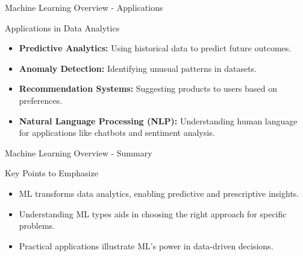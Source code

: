 \documentclass[aspectratio=169]{beamer}
\begin{document}
\begin{frame}[fragile]{Machine Learning Overview - Applications}
    \begin{block}{Applications in Data Analytics}
        \begin{itemize}
            \item \textbf{Predictive Analytics:} Using historical data to predict future outcomes.
            \item \textbf{Anomaly Detection:} Identifying unusual patterns in datasets.
            \item \textbf{Recommendation Systems:} Suggesting products to users based on preferences.
            \item \textbf{Natural Language Processing (NLP):} Understanding human language for applications like chatbots and sentiment analysis.
        \end{itemize}
    \end{block}
\end{frame}

\begin{frame}[fragile]{Machine Learning Overview - Summary}
    \begin{block}{Key Points to Emphasize}
        \begin{itemize}
            \item ML transforms data analytics, enabling predictive and prescriptive insights.
            \item Understanding ML types aids in choosing the right approach for specific problems.
            \item Practical applications illustrate ML's power in data-driven decisions.
        \end{itemize}
    \end{block}
\end{frame}
\end{document}
